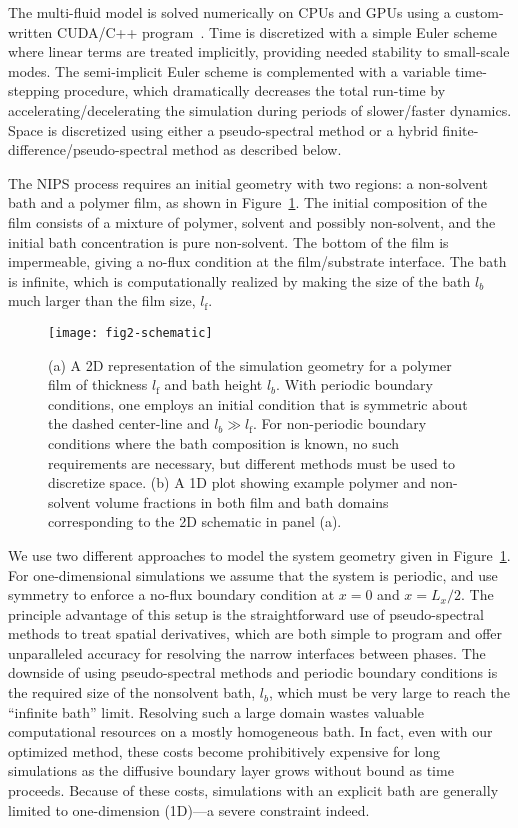 \documentclass[journal=mamobx, layout=twocolumn]{achemso}
\newcommand{\txtf}{\mathrm{f}}
\begin{document}
The multi-fluid model is solved numerically on CPUs and GPUs using a custom-written CUDA/C++ program~\cite{Tree2017}.
Time is discretized with a simple Euler scheme where linear terms are treated implicitly, providing needed stability to small-scale modes.
The semi-implicit Euler scheme is complemented with a variable time-stepping procedure, which dramatically decreases the total run-time by accelerating/decelerating the simulation during periods of slower/faster dynamics.
Space is discretized using either a pseudo-spectral method or a hybrid finite-difference/pseudo-spectral method as described below.

The NIPS process requires an initial geometry with two regions: a non-solvent bath and a polymer film, as shown in Figure~\ref{fig-schematic}.
The initial composition of the film consists of a mixture of polymer, solvent and possibly non-solvent, and the initial bath concentration is pure non-solvent.
The bottom of the film is impermeable, giving a no-flux condition at the film/substrate interface.
The bath is infinite, which is computationally realized by making the size of the bath $l_{b}$ much larger than the film size, $l_{\txtf}$.

\begin{figure}[tb]
  \texttt{[image: fig2-schematic]}
  \caption{(a) A 2D representation of the simulation geometry for a polymer film of thickness $l_{\txtf}$ and bath height $l_{b}$.
With periodic boundary conditions, one employs an initial condition that is symmetric about the dashed center-line and $l_{b} \gg l_{\txtf}$.
For non-periodic boundary conditions where the bath composition is known, no such requirements are necessary, but different methods must be used to discretize space.
 (b) A 1D plot showing example polymer and non-solvent volume fractions in both film and bath domains corresponding to the 2D schematic in panel (a).}
  \label{fig-schematic}
\end{figure}

We use two different approaches to model the system geometry given in Figure~\ref{fig-schematic}.
For one-dimensional simulations we assume that the system is periodic, and use symmetry to enforce a no-flux boundary condition at $x = 0$ and $x = L_{x}/2$.
The principle advantage of this setup is the straightforward use of pseudo-spectral methods to treat spatial derivatives, which are both simple to program and offer unparalleled accuracy for resolving the narrow interfaces between phases.
The downside of using pseudo-spectral methods and periodic boundary conditions is the required size of the nonsolvent bath, $l_{b}$, which must be very large to reach the ``infinite bath'' limit.
Resolving such a large domain wastes valuable computational resources on a mostly homogeneous bath.
In fact, even with our optimized method, these costs become prohibitively expensive for long simulations as the diffusive boundary layer grows without bound as time proceeds.
Because of these costs, simulations with an explicit bath are generally limited to one-dimension (1D)---a severe constraint indeed.
\end{document}
